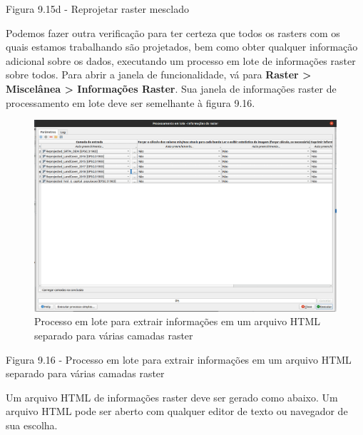 \documentclass[
]{krantz}
\begin{document}
Figura 9.15d - Reprojetar raster mesclado

Podemos fazer outra verificação para ter certeza que todos os rasters com os quais estamos trabalhando são projetados, bem como obter qualquer informação adicional sobre os dados, executando um processo em lote de informações raster sobre todos. Para abrir a janela de funcionalidade, vá para \textbf{Raster \textgreater{} Miscelânea \textgreater{} Informações Raster}. Sua janela de informações raster de processamento em lote deve ser semelhante à figura 9.16.

\begin{figure}
\centering
\includegraphics{media/modulo9/fig916.png}
\caption{Processo em lote para extrair informações em um arquivo HTML separado para várias camadas raster}
\end{figure}

Figura 9.16 - Processo em lote para extrair informações em um arquivo HTML separado para várias camadas raster

Um arquivo HTML de informações raster deve ser gerado como abaixo. Um arquivo HTML pode ser aberto com qualquer editor de texto ou navegador de sua escolha.
\end{document}
